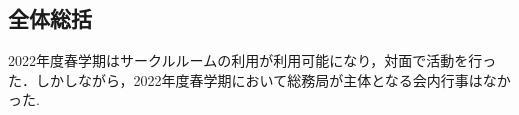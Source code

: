\subsection*{全体総括}


2022年度春学期はサークルルームの利用が利用可能になり，対面で活動を行った．しかしながら，2022年度春学期において総務局が主体となる会内行事はなかった.
